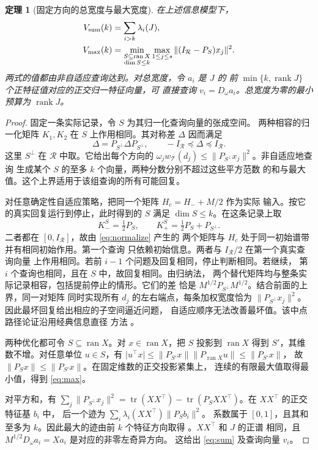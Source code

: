 \documentclass[UTF8,11pt,fontset=windows]{ctexart}
\newtheorem{theorem}{定理}
\newcommand{\tr}{\operatorname{tr}}
\newcommand{\ran}{\operatorname{ran}}
\newcommand{\rank}{\operatorname{rank}}
\newcommand{\Tcal}{\mathcal T}
\begin{document}
\begin{theorem}[固定方向的总宽度与最大宽度]\label{thm:main}
在上述信息模型下，
\begin{align}
 V_{\rm sum}(k)&=\sum_{i>k}\lambda_i(J),\label{eq:sum}\\
 V_{\rm max}(k)&=\min_{\substack{S\subseteq\ran X\\\dim S\le k}}
          \max_{1\le j\le s}\|(I_{\mathcal R}-P_S)x_j\|^2.\label{eq:max}
\end{align}
两式的值都由非自适应查询达到。对总宽度，令 \(a_i\) 是 \(J\) 的
前 \(\min\{k,\rank J\}\) 个正特征值对应的正交归一特征向量，可
直接查询 \(v_i=D_\omega a_i\)。总宽度为零的最小预算为 \(\rank J\)。
\end{theorem}

\begin{proof}
固定一条实际记录，令 \(S\) 为其归一化查询向量的张成空间。
两种相容的归一化矩阵 \(K_1,K_2\) 在 \(S\) 上作用相同。其对称差
\(\Delta\) 因而满足
\[
 \Delta=P_{S^\perp}\Delta P_{S^\perp},\qquad
 -I_{\mathcal R}\preceq\Delta\preceq I_{\mathcal R}.
\]
这里 \(S^\perp\) 在 \(\mathcal R\) 中取。它给出每个方向的
\(\omega_j w_{\Tcal}(d_j)\le\|P_{S^\perp}x_j\|^2\)。非自适应地查询
生成某个 \(S\) 的至多 \(k\) 个向量，两种分数分别不超过这些平方范数
的和与最大值。这个上界适用于该组查询的所有可能回复。

对任意确定性自适应策略，把同一个矩阵 \(H_c=H_-+M/2\) 作为实际
输入。按它的真实回复运行到停止，此时得到的 \(S\) 满足
\(\dim S\le k\)。在这条记录上取
\[
 K_-^S=\tfrac12 P_S,\qquad K_+^S=\tfrac12 P_S+P_{S^\perp}.
\]
二者都在 \([0,I_{\mathcal R}]\)，故由 \eqref{eq:normalize} 产生的
两个矩阵与 \(H_c\) 处于同一初始谱带并有相同初始作用。第一个查询
只依赖初始信息。两者与 \(I_{\mathcal R}/2\) 在第一个真实查询向量
上作用相同。若前 \(i-1\) 个问题及回复相同，停止判断相同。若继续，
第 \(i\) 个查询也相同，且在 \(S\) 中，故回复相同。由归纳法，
两个替代矩阵均与整条实际记录相容，包括提前停止的情形。它们的差
恰是 \(M^{1/2}P_{S^\perp} M^{1/2}\)。结合前面的上界，同一对矩阵
同时实现所有 \(d_j\) 的左右端点，每条加权宽度恰为
\(\|P_{S^\perp}x_j\|^2\)。因此最坏回复给出相应的子空间逼近问题，
自适应顺序无法改善最坏值。该中点路径论证沿用经典信息直径
方法 \cite{Bakhvalov,TraubWozniakowski}。

两种优化都可令 \(S\subseteq\ran X\)。对 \(x\in\ran X\)，把
\(S\) 投影到 \(\ran X\) 得到 \(S'\)，其维数不增。对任意单位
\(u\in S\)，有
\(\lvert u^\top x\rvert\le\|P_{S'}x\|\|P_{\ran X}u\|\le\|P_{S'}x\|\)，
故 \(\|P_S x\|\le\|P_{S'}x\|\)。在固定维数的正交投影紧集上，
连续的有限最大值取得最小值，得到 \eqref{eq:max}。

对平方和，有 \(\sum_j\|P_{S^\perp}x_j\|^2=\tr(XX^\top)-
\tr(P_S XX^\top)\)。在 \(XX^\top\) 的正交特征基 \(b_i\) 中，
后一个迹为 \(\sum_i\lambda_i(XX^\top)\|P_S b_i\|^2\)。
系数属于 \([0,1]\)，且其和至多为 \(k\)。因此最大的迹由前
\(k\) 个特征方向取得 \cite{Fan}。\(XX^\top\) 和 \(J\) 的正谱
相同，且 \(M^{1/2}D_\omega a_i=Xa_i\) 是对应的非零左奇异方向。
这给出 \eqref{eq:sum} 及查询向量 \(v_i\)。
\end{proof}
\end{document}
